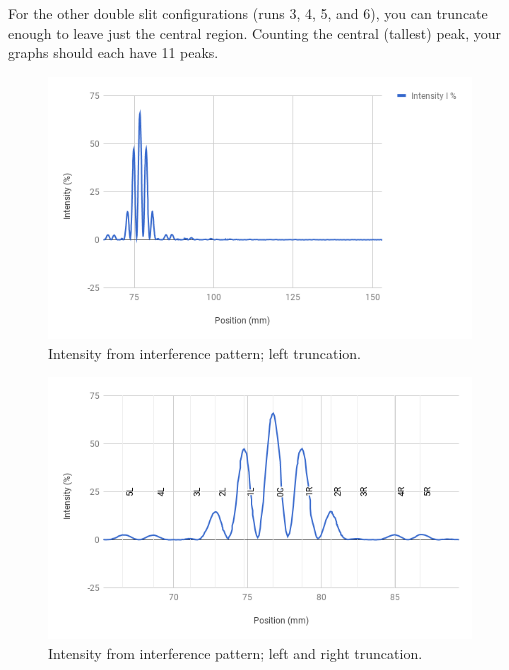 For the other double slit configurations (runs 3, 4, 5, and 6), you can truncate enough to leave just the central region. Counting the central (tallest) peak, your graphs should each have 11 peaks.
\begin{figure}[ht!]
	\centering
	\includegraphics[scale=0.77]{image/10-interference/chart2.png}
	\caption{Intensity from interference pattern; left truncation.}
	\label{chart2}
\end{figure}
\begin{figure}[ht!]
	\centering
	\includegraphics[scale=0.77]{image/10-interference/chart3.png}
	\caption{Intensity from interference pattern; left and right truncation.}
	\label{chart3}
\end{figure}
